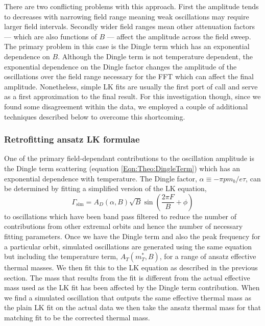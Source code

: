 There are two conflicting problems with this approach. First the amplitude tends to decreases with narrowing field range meaning weak oscillations may require larger field intervals. Secondly wider field ranges mean other attenuation factors --- which are also functions of $B$ --- affect the amplitude across the field sweep. The primary problem in this case is the Dingle term which has an exponential dependence on $B$. Although the Dingle term is not temperature dependent, the exponential dependence on the Dingle factor changes the amplitude of the oscillations over the field range necessary for the \ac{FFT} which can affect the final amplitude. Nonetheless, simple \ac{LK} fits are usually the first port of call and serve as a first approximation to the final result. For this investigation though, since we found some disagreement within the data, we employed a couple of additional techniques described below to overcome this shortcoming.

\subsubsection{Retrofitting ansatz \ac{LK} formulae}
\label{Sec:Exp:LKRetrofitting}

One of the primary field-dependant contributions to the oscillation amplitude is the Dingle term scattering (equation \ref{Eqn:Theo:DingleTerm}) which has an exponential dependence with temperature. The Dingle factor, $\alpha \equiv -\pi p m_b/e\tau$, can be determined by fitting a simplified version of the \ac{LK} equation,
\begin{equation}
    \Gamma_{\textrm{sim}} =  A_D(\alpha, B) \sqrt{B} \sin{\left(\frac{2\pi F}{B} + \phi \right)}
\end{equation}
 to oscillations which have been band pass filtered to reduce the number of contributions from other extremal orbits and hence the number of necessary fitting parameters. Once we have the Dingle term and also the peak frequency for a particular orbit, simulated oscillations are generated using the same equation but including the temperature term, $A_T(m^*_T, B)$, for a range of ansatz effective thermal masses. We then fit this to the \ac{LK} equation as described in the previous section. The mass that results from the fit is different from the actual effective mass used as the \ac{LK} fit has been affected by the Dingle term contribution. When we find a simulated oscillation that outputs the same effective thermal mass as the plain \ac{LK} fit on the actual data we then take the ansatz thermal mass for that matching fit to be the corrected thermal mass.

